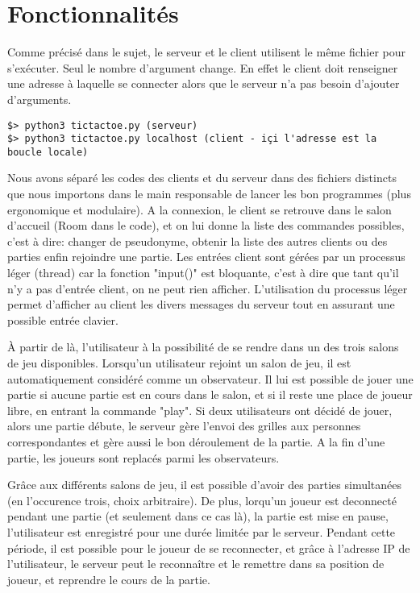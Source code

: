 \documentclass[a4paper]{article}
\begin{document}
\section{Fonctionnalités}

Comme précisé dans le sujet, le serveur et le client utilisent le même fichier pour s'exécuter. Seul le nombre d'argument change. En effet le client doit renseigner une adresse à laquelle se connecter alors que le serveur n'a pas besoin d'ajouter d'arguments.

\begin{verbatim}
$> python3 tictactoe.py (serveur)
$> python3 tictactoe.py localhost (client - içi l'adresse est la boucle locale)
\end{verbatim}

Nous avons séparé les codes des clients et du serveur dans des fichiers distincts que nous importons dans le main responsable de lancer les bon programmes (plus ergonomique et modulaire).
A la connexion, le client se retrouve dans le salon d'accueil (Room dans le code), et on lui donne la liste des commandes possibles, c'est à dire:
changer de pseudonyme,
obtenir la liste des autres clients ou des parties
enfin rejoindre une partie.
Les entrées client sont gérées par un processus léger (thread) car la fonction "input()" est bloquante, c'est à dire que tant qu'il n'y a pas d'entrée client, on ne peut rien afficher. L'utilisation du processus léger permet d'afficher au client les divers messages du serveur tout en assurant une possible entrée clavier.


À partir de là, l'utilisateur à la possibilité de se rendre dans un des trois salons de jeu disponibles. Lorsqu'un utilisateur rejoint un salon de jeu, il est automatiquement considéré comme un observateur. Il lui est possible de jouer une partie si aucune partie est en cours dans le salon, et si il reste une place de joueur libre, en entrant la commande "play". Si deux utilisateurs ont décidé de jouer, alors une partie débute, le serveur gère l'envoi des grilles aux personnes correspondantes et gère aussi le bon déroulement de la partie. A la fin d'une partie, les joueurs sont replacés parmi les observateurs.


Grâce aux différents salons de jeu, il est possible d'avoir des parties simultanées (en l'occurence trois, choix arbitraire). De plus, lorqu'un joueur est deconnecté pendant une partie (et seulement dans ce cas là), la partie est mise en pause, l'utilisateur est enregistré pour une durée limitée par le serveur. Pendant cette période, il est possible pour le joueur de se reconnecter, et grâce à l'adresse IP de l'utilisateur, le serveur peut le reconnaître et le remettre dans sa position de joueur, et reprendre le cours de la partie.
\end{document}

